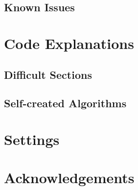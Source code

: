 \subsection{Known Issues}

\section{Code Explanations}

\subsection{Difficult Sections}

\subsection{Self-created Algorithms}

\section{Settings}

\section{Acknowledgements}

